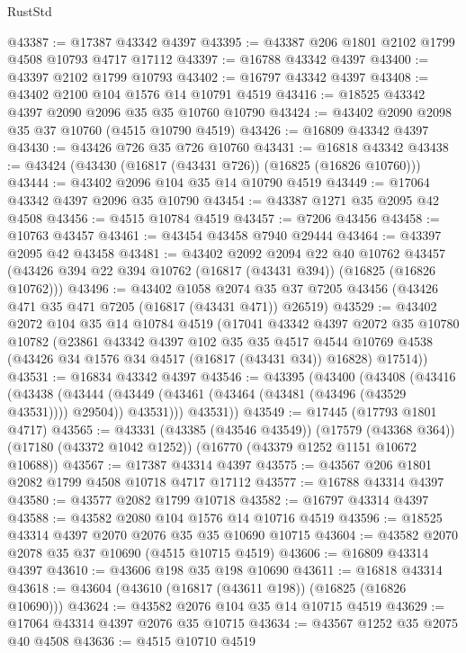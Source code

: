 \begin{lexlean}{RustStd}
\begin{coremodule}
@43387 := @17387 @43342 @4397
@43395 := @43387 @206 @1801 @2102 @1799 @4508 @10793 @4717 @17112
@43397 := @16788 @43342 @4397
@43400 := @43397 @2102 @1799 @10793
@43402 := @16797 @43342 @4397
@43408 := @43402 @2100 @104 @1576 @14 @10791 @4519
@43416 := @18525 @43342 @4397 @2090 @2096 @35 @35 @10760 @10790
@43424 := @43402 @2090 @2098 @35 @37 @10760 (@4515 @10790 @4519)
@43426 := @16809 @43342 @4397
@43430 := @43426 @726 @35 @726 @10760
@43431 := @16818 @43342
@43438 := @43424 (@43430 (@16817 (@43431 @726)) (@16825 (@16826 @10760)))
@43444 := @43402 @2096 @104 @35 @14 @10790 @4519
@43449 := @17064 @43342 @4397 @2096 @35 @10790
@43454 := @43387 @1271 @35 @2095 @42 @4508
@43456 := @4515 @10784 @4519
@43457 := @7206 @43456
@43458 := @10763 @43457
@43461 := @43454 @43458 @7940 @29444
@43464 := @43397 @2095 @42 @43458
@43481 := @43402
    @2092
    @2094
    @22
    @40
    @10762
    @43457
    (@43426 @394 @22 @394 @10762 (@16817 (@43431 @394)) (@16825 (@16826 @10762)))
@43496 := @43402
    @1058
    @2074
    @35
    @37
    @7205
    @43456
    (@43426 @471 @35 @471 @7205 (@16817 (@43431 @471)) @26519)
@43529 := @43402
    @2072
    @104
    @35
    @14
    @10784
    @4519
    (@17041
      @43342
      @4397
      @2072
      @35
      @10780
      @10782
      (@23861
        @43342
        @4397
        @102
        @35
        @35
        @4517
        @4544
        @10769
        @4538
        (@43426 @34 @1576 @34 @4517 (@16817 (@43431 @34)) @16828)
        @17514))
@43531 := @16834 @43342 @4397
@43546 := @43395
    (@43400
      (@43408
        (@43416
          (@43438
            (@43444 (@43449 (@43461 (@43464 (@43481 (@43496 (@43529 @43531)))) @29504)) @43531)))
        @43531))
@43549 := @17445 (@17793 @1801 @4717)
@43565 := @43331
    (@43385 (@43546 @43549))
    (@17579 (@43368 @364))
    (@17180 (@43372 @1042 @1252))
    (@16770 (@43379 @1252 @1151 @10672 @10688))
@43567 := @17387 @43314 @4397
@43575 := @43567 @206 @1801 @2082 @1799 @4508 @10718 @4717 @17112
@43577 := @16788 @43314 @4397
@43580 := @43577 @2082 @1799 @10718
@43582 := @16797 @43314 @4397
@43588 := @43582 @2080 @104 @1576 @14 @10716 @4519
@43596 := @18525 @43314 @4397 @2070 @2076 @35 @35 @10690 @10715
@43604 := @43582 @2070 @2078 @35 @37 @10690 (@4515 @10715 @4519)
@43606 := @16809 @43314 @4397
@43610 := @43606 @198 @35 @198 @10690
@43611 := @16818 @43314
@43618 := @43604 (@43610 (@16817 (@43611 @198)) (@16825 (@16826 @10690)))
@43624 := @43582 @2076 @104 @35 @14 @10715 @4519
@43629 := @17064 @43314 @4397 @2076 @35 @10715
@43634 := @43567 @1252 @35 @2075 @40 @4508
@43636 := @4515 @10710 @4519

\end{coremodule}
\end{lexlean}
